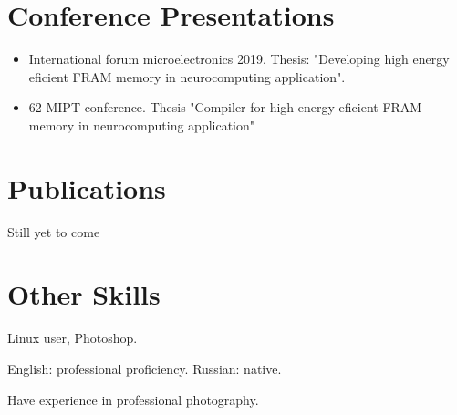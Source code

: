 \documentclass{article}
\begin{document}
\section{Conference Presentations }

\begin{itemize}
\item International forum microelectronics 2019. Thesis: "Developing high energy eficient FRAM memory in neurocomputing application".
\item 62 MIPT conference. Thesis "Compiler for high energy eficient FRAM memory in neurocomputing application"
\end{itemize}


\section{Publications}
Still yet to come %


\section{Other Skills}
\begin{description}[widest=Langauges]
\item[Software]	Linux user, Photoshop.
\item[Languages]	English: professional proficiency.  Russian: native.
\item[Photography] Have experience in professional photography.
\end{description}
\end{document}
